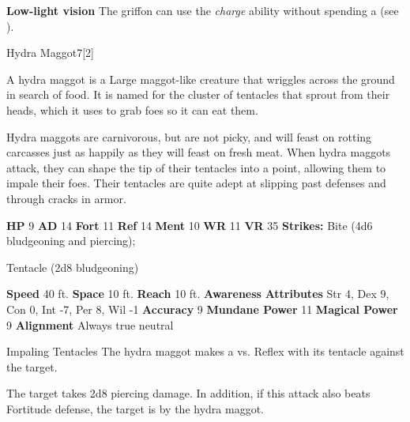       
      \par\noindent\textbf{Low-light vision}
      The griffon can use the \textit{charge} ability without spending a  (see ).
  
  \begin{monsection}{Hydra Maggot}{7}[2]
    \vspace{-1em}\vspace{-1em}
    \vspace{0em}

    
        A hydra maggot is a Large maggot-like creature that wriggles across the ground in search of food.
        It is named for the cluster of tentacles that sprout from their heads, which it uses to grab foes so it can eat them.
      
        Hydra maggots are carnivorous, but are not picky, and will feast on rotting carcasses just as happily as they will feast on fresh meat.
        When hydra maggots attack, they can shape the tip of their tentacles into a point, allowing them to impale their foes.
        Their tentacles are quite adept at slipping past defenses and through cracks in armor.
      

    \begin{spellcontent}
      \begin{spelltargetinginfo}
        \pari \textbf{HP} 9 \monsep
          \textbf{AD} 14 \monsep
          \textbf{Fort} 11 \monsep
          \textbf{Ref} 14 \monsep
          \textbf{Ment} 10
        \pari \textbf{WR} 11 \monsep
        \textbf{VR} 35
        \pari \textbf{Strikes:}
            Bite  (4d6 bludgeoning and piercing);
\par Tentacle  (2d8 bludgeoning)
      \end{spelltargetinginfo}
    \end{spellcontent}
    \begin{monsterfooter}
      \pari \textbf{Speed} 40 ft. \monsep
        \textbf{Space} 10 ft. \monsep
        \textbf{Reach} 10 ft.
      \pari \textbf{Awareness} 
      \pari \textbf{Attributes}
        Str 4, Dex 9,
        Con 0, Int -7,
        Per 8, Wil -1
      \pari \textbf{Accuracy} 9 \monsep
        \textbf{Mundane Power} 11 \monsep
      \textbf{Magical Power} 9
      \pari \textbf{Alignment} Always true neutral
    \end{monsterfooter}
  \end{monsection}
  \begin{freeability}{Impaling Tentacles}
       The hydra maggot makes a 
         vs. Reflex
        with its tentacle against the target.
    
    \hit 
          The target takes 2d8 piercing damage.
          In addition, if this attack also beats Fortitude defense, the target is  by the hydra maggot.
    \end{freeability}
  
